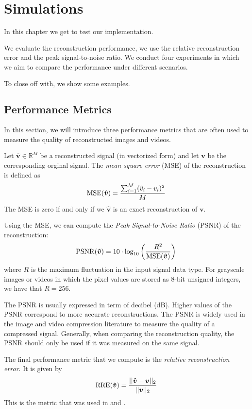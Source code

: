\chapter{Simulations}
\label{ch:results}
In this chapter we get to test our implementation.

We evaluate the reconstruction performance, we use the relative reconstruction error and the peak signal-to-noise ratio.
We conduct four experiments in which we aim to compare the performance under different scenarios.

To close off with, we show some examples.

\section{Performance Metrics}
In this section, we will introduce three performance metrics that are often used to measure the quality of reconstructed images and videos.

Let $\bm{\hat v} \in\mathbb{R}^M$ be a reconstructed signal (in vectorized form) and let $\bm v$ be the corresponding orginal signal.
The \emph{mean square error} (MSE) of the reconstruction is defined as
\begin{equation*}
  \operatorname*{MSE}(\bm{\hat v}) = \frac{\sum_{i=1}^M (\hat v_i - v_i)^2}{M}
\end{equation*}
The MSE is zero if and only if we $\bm{\hat v}$ is an exact reconstruction of $\bm v$.

Using the MSE, we can compute the \emph{Peak Signal-to-Noise Ratio} (PSNR) of the reconstruction:
\begin{equation*}
  \operatorname*{PSNR}(\bm{\hat v}) = 10 \cdot \log_{10} \left(\frac{R^2}{\operatorname*{MSE}(\bm{\hat v})}\right)
\end{equation*}
where $R$ is the maximum fluctuation in the input signal data type. 
For grayscale images or videos in which the pixel values are stored as 8-bit unsigned integers, we have that $R = 256$.

The PSNR is usually expressed in term of decibel (dB). 
Higher values of the PSNR correspond to more accurate reconstructions.
The PSNR is widely used in the image and video compression literature to measure the quality of a compressed signal.
Generally, when comparing the reconstruction quality, the PSNR should only be used if it was measured on the same signal.

The final performance metric that we compute is the \emph{relative reconstruction error}.
It is given by
\begin{equation*}
  \operatorname*{RRE}(\bm{\hat v}) = \frac{||\bm{\hat v} - \bm v||_2}{||\bm v||_2}
\end{equation*}
This is the metric that was used in \cite{ji2008} and \cite{pilikos2014}.

